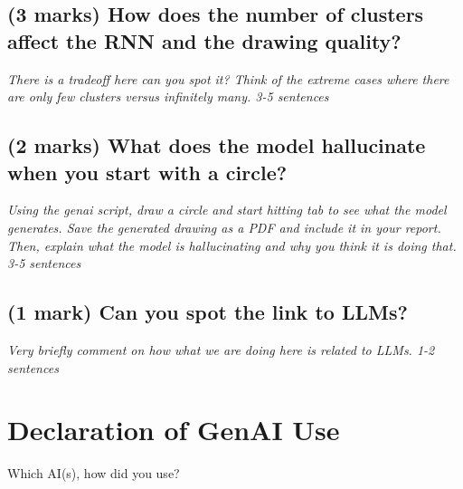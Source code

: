 \documentclass[11pt,a4paper]{article}
\begin{document}
\subsection{(3 marks) How does the number of clusters affect the RNN and the drawing quality?}\label{p2_report_num_clusters_effect}

\textit{There is a tradeoff here can you spot it? Think of the extreme cases where there are only few clusters versus infinitely many. 3-5 sentences}

\subsection{(2 marks) What does the model hallucinate when you start with a circle?}\label{p2_report_circle_hallucination}

\textit{Using the genai script, draw a circle and start hitting tab to see what the model generates. Save the generated drawing as a PDF and include it in your report. Then, explain what the model is hallucinating and why you think it is doing that. 3-5 sentences}

\subsection{(1 mark) Can you spot the link to LLMs?}\label{p2_report_llm_link}

\textit{Very briefly comment on how what we are doing here is related to LLMs. 1-2 sentences}

\section*{Declaration of GenAI Use}

Which AI(s), how did you use?
\end{document}
